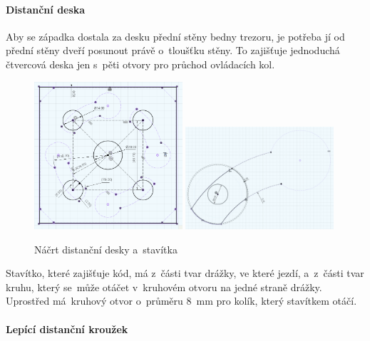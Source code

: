 \paragraph{Distanční deska}

Aby se západka dostala za desku přední stěny bedny trezoru, je potřeba jí od přední stěny dveří posunout právě o~tloušťku stěny. To zajišťuje jednoduchá čtvercová deska jen s~pěti otvory
pro průchod ovládacích kol.

\begin{figure}[h]
	\centering
    \includegraphics[width=0.49\textwidth]{kapitoly/obrazky/M3/distancka.png}
    \includegraphics[width=0.49\textwidth]{kapitoly/obrazky/M3/kamen.png}
    \caption{Náčrt distanční desky a~stavítka}
    \label{fig:M3-kamen}
    \label{fig:M3-distancka}
\end{figure}

Stavítko, které zajišťuje kód, má z~části tvar drážky, ve které jezdí, a~z~části tvar kruhu, který se~může otáčet v~kruhovém otvoru na jedné straně drážky.
Uprostřed má~kruhový otvor o~průměru 8~mm pro kolík, který stavítkem otáčí.

\paragraph{Lepící distanční kroužek}

